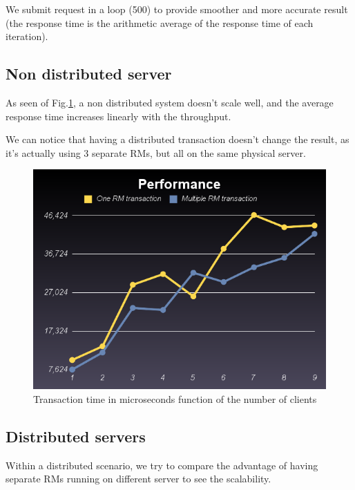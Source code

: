 \documentclass[a4paper]{article}
\begin{document}
We submit request in a loop (500) to provide smoother and more accurate result (the response time is the arithmetic average of the response time of each iteration).

\subsection{Non distributed server}

As seen of Fig.\ref{oneserver}, a non distributed system doesn't scale well, and the average response time increases linearly with the throughput.

We can notice that having a distributed transaction doesn't change the result, as it's actually using 3 separate RMs, but all on the same physical server.

\begin{figure}[ht!]
  \centering
	\includegraphics[scale=0.5]{oc_linear.png}
  \caption{Transaction time in microseconds function of the number of clients}
  \label{oneserver}
\end{figure}


\subsection{Distributed servers}

Within a distributed scenario, we try to compare the advantage of having separate RMs running on different server to see the scalability.
\end{document}
